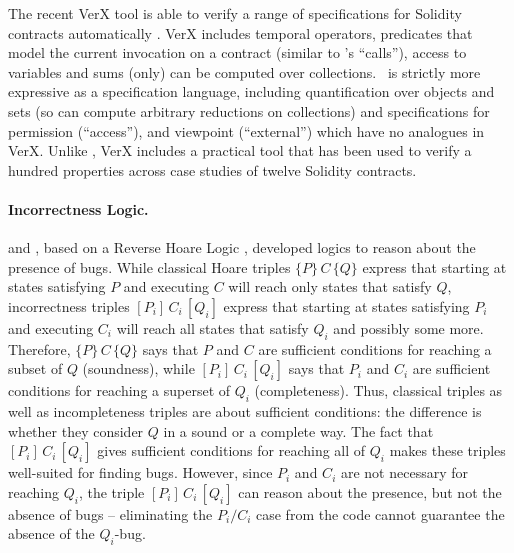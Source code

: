 {%


The recent VerX tool is able to verify a range of
specifications for Solidity contracts automatically \cite{VerX}.
VerX includes  temporal operators, predicates that
model the current invocation on a contract (similar to \Chainmail's
``calls''), access to variables
and  sums (only) can be computed over collections. 
\Chainmail\ is strictly more expressive as a
specification language, including quantification over objects and sets
(so can compute arbitrary reductions on collections) and %
specifications for permission (``access''), %
and viewpoint (``external'') which have no analogues in VerX. 
Unlike \Chainmail, VerX includes a practical tool that has
been used to verify a hundred properties across case studies of
twelve Solidity contracts.


\paragraph{Incorrectness Logic.} \citeauthor{IncorrectnessLogic} and \citeauthor{IncorrectSeparation},
based on a Reverse Hoare Logic \cite{reverseHoare}, 
developed logics to reason about the presence of bugs.
While  classical Hoare triples $\{ P \}\, C\, \{ Q \}$ express  that starting 
at states satisfying $P$ and executing   $C$ will reach only states that satisfy $ Q $,
 incorrectness triples $[ P_i ]\, C_i\, [ Q _i ]$ express  that starting at  
 states satisfying $P_i$ and executing  $C_i$ will reach 
 all states that satisfy $Q_i$ and possibly some more.
Therefore,   $\{ P \}\, C\, \{ Q \}$ says that 
$P$ and $C$ 
are sufficient conditions for reaching a subset of $Q$ (soundness),
while 
$[ P_i ]\, C_i\, [ Q _i ]$ says that $P_i$ and $C_i$ 
are sufficient conditions for reaching  a superset of $Q_i$ (completeness).
Thus,  classical triples as well as incompleteness triples are about sufficient conditions:
  the difference is whether they consider $Q$ in a sound or a complete way.
The fact that  $[ P_i ]\, C_i\, [ Q _i ]$ gives sufficient conditions for reaching all of $Q_i$ 
makes these triples well-suited for finding bugs. However, since
$P_i$ and $C_i$ are not necessary for reaching $Q_i$, the triple
 $[ P_i ]\, C_i\, [ Q _i ]$ can reason about the presence, but not the absence of
 bugs --
eliminating the $P_i/C_i$ case from the code cannot guarantee the absence of the $Q_i$-bug.



}
